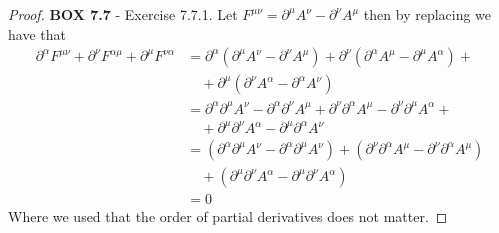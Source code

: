 \documentclass[11pt]{article}
\theoremstyle{definition}
\begin{document}
\begin{proof}{\textbf{BOX 7.7} - Exercise 7.7.1.}
    Let $F^{\mu\nu} = \partial^\mu A^\nu - \partial^\nu A^\mu$ then by replacing 
    we have that
    \begin{align*}
        \partial^\alpha F^{\mu\nu} + \partial^\nu F^{\alpha\mu}
        + \partial^\mu F^{\nu\alpha}
        &= \partial^\alpha (\partial^\mu A^\nu - \partial^\nu A^\mu)
        + \partial^\nu (\partial^\alpha A^\mu - \partial^\mu A^\alpha) +\\
        &\quad+ \partial^\mu (\partial^\nu A^\alpha - \partial^\alpha A^\nu)\\
        &= \partial^\alpha\partial^\mu A^\nu - \partial^\alpha\partial^\nu A^\mu
        + \partial^\nu \partial^\alpha A^\mu - \partial^\nu \partial^\mu A^\alpha +\\
        &\quad+ \partial^\mu\partial^\nu A^\alpha - \partial^\mu\partial^\alpha A^\nu\\
        &= (\partial^\alpha\partial^\mu A^\nu
        - \partial^\alpha\partial^\mu A^\nu)
        + (\partial^\nu \partial^\alpha A^\mu
        - \partial^\nu \partial^\alpha A^\mu)\\
        &\quad+ (\partial^\mu\partial^\nu A^\alpha
        - \partial^\mu\partial^\nu A^\alpha)\\
        &= 0
    \end{align*}
    Where we used that the order of partial derivatives does not matter.
\end{proof}
\cleardoublepage
\end{document}
